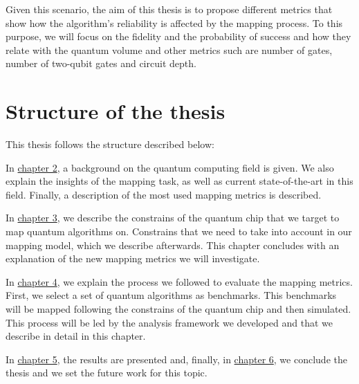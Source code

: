 Given this scenario, the aim of this thesis is to propose different metrics that show how the algorithm's reliability is affected by the mapping process.  To this purpose, we will focus on the fidelity  and the probability of success and how they relate with the quantum volume and other metrics such are number of gates, number of two-qubit gates and circuit depth.

\section{Structure of the thesis}
\label{sec:orgdf4cd06}
This thesis follows the structure described below:

In \hyperref[sec:org9b8733c]{chapter 2}, a background on the quantum computing field is given. 
We also explain the insights of the mapping task, as well as current state-of-the-art in this field.
Finally, a description of the most used mapping metrics is described.

In \hyperref[sec:org0c87802]{chapter 3}, we describe the constrains of the quantum chip that we target to map quantum algorithms on.
Constrains that we need to take into account in our mapping model, which we describe afterwards.
This chapter concludes with an explanation of the new mapping metrics we will investigate.

In \hyperref[sec:org17c0cef]{chapter 4}, we explain the process we followed to evaluate the mapping metrics. 
First, we select a set of quantum algorithms as benchmarks.
This benchmarks will be mapped following the constrains of the quantum chip and then simulated.
This process will be led by the analysis framework we developed and that we describe in detail in this chapter.

In \hyperref[sec:orgaed8c93]{chapter 5}, the results are presented and, finally, in \hyperref[sec:org7d44186]{chapter 6}, we conclude the thesis and we set the future work for this topic.